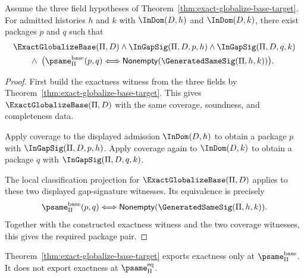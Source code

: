 \begin{theorem}
\label{thm:exact-globalize-base-pair-witness-export}
Assume the three field hypotheses of Theorem~\ref{thm:exact-globalize-base-target}. For admitted histories $h$ and $k$ with $\InDom(D,h)$ and $\InDom(D,k)$, there exist packages $p$ and $q$ such that
$$
\begin{aligned}
  &\ExactGlobalizeBase(\Pi,D)
  \wedge \InGapSig(\Pi,D,p,h)
  \wedge \InGapSig(\Pi,D,q,k)
  \\
  &\qquad\wedge\;
  \bigl(\psame_{\Pi}^{\mathrm{base}}(p,q)
    \Longleftrightarrow \mathsf{Nonempty}(\GeneratedSameSig(\Pi,h,k))\bigr).
\end{aligned}
$$
\end{theorem}

\begin{proof}
First build the exactness witness from the three fields by Theorem~\ref{thm:exact-globalize-base-target}. This gives $\ExactGlobalizeBase(\Pi,D)$ with the same coverage, soundness, and completeness data.

Apply coverage to the displayed admission $\InDom(D,h)$ to obtain a package $p$ with $\InGapSig(\Pi,D,p,h)$. Apply coverage again to $\InDom(D,k)$ to obtain a package $q$ with $\InGapSig(\Pi,D,q,k)$.

The local classification projection for $\ExactGlobalizeBase(\Pi,D)$ applies to these two displayed gap-signature witnesses. Its equivalence is precisely
$$
  \psame_{\Pi}^{\mathrm{base}}(p,q)
  \Longleftrightarrow
  \mathsf{Nonempty}(\GeneratedSameSig(\Pi,h,k)).
$$
Together with the constructed exactness witness and the two coverage witnesses, this gives the required package pair.
\end{proof}

\begin{corollary}
\label{cor:no-closure-export}
Theorem~\ref{thm:exact-globalize-base-target} exports exactness only at \(\psame_{\Pi}^{\mathrm{base}}\). It does not export exactness at \(\psame_{\Pi}^{\mathrm{eq}}\).
\end{corollary}

